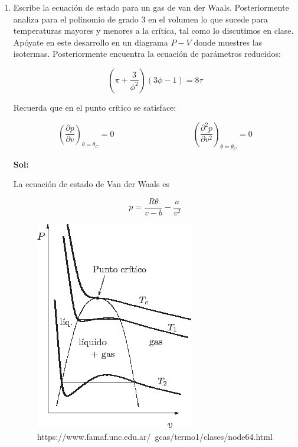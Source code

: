 \documentclass[12pt,a4paper]{article}
\begin{document}
\begin{enumerate}
    \item Escribe la ecuación de estado para un gas de van der Waals. Posteriormente analiza para el polinomio de grado 3 en el volumen lo que sucede para temperaturas mayores y menores a la crítica, tal como lo discutimos en clase. Apóyate en este desarrollo en un diagrama $P-V$ donde muestres las isotermas. Posteriormente encuentra la ecuación de parámetros reducidos:
    
    \begin{equation*}
        \left(\pi + \frac{3}{\phi^2}\right) (3\phi -1) = 8 \tau
    \end{equation*}
    
    Recuerda que en el punto crítico se satisface:
    
    \begin{equation*}
        \left(\frac{\partial p}{\partial v}\right)_{\theta = \theta_C} =0\hspace{4cm} \left(\frac{\partial^2 p}{\partial v^2}\right)_{\theta = \theta_C} =0
    \end{equation*}
    
    \textbf{Sol:}
    
    La ecuación de estado de Van der Waals es
    
    \begin{equation}
        p = \frac{R \theta}{v-b} - \frac{a}{v^2}
    \end{equation}
    
    \begin{figure}[h!]
        \centering
        \includegraphics[scale=0.6]{img823.png}
        \caption{https://www.famaf.unc.edu.ar/~gcas/termo1/clases/node64.html}
    \end{figure}
    

\end{enumerate}
\end{document}
